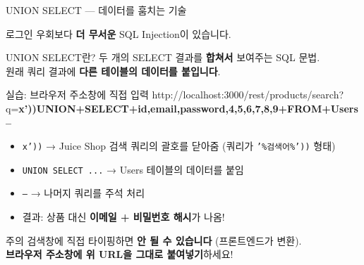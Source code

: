 \documentclass[aspectratio=169,10pt]{beamer}
\newcommand{\hlt}[1]{\textcolor{accent}{\textbf{#1}}}
\newcommand{\red}[1]{\textcolor{redTeam}{\textbf{#1}}}
\begin{document}
\begin{frame}[shrink=3]{UNION SELECT — 데이터를 훔치는 기술}

로그인 우회보다 \hlt{더 무서운} SQL Injection이 있습니다.

\vspace{0.3em}
\begin{block}{UNION SELECT란?}
두 개의 SELECT 결과를 \hlt{합쳐서} 보여주는 SQL 문법.\\
원래 쿼리 결과에 \textbf{다른 테이블의 데이터를 붙입니다}.
\end{block}

\vspace{0.3em}
\begin{block}{실습: 브라우저 주소창에 직접 입력}
{\ttfamily\tiny
http://localhost:3000/rest/products/search?q=\red{x'))UNION+SELECT+id,email,password,4,5,6,7,8,9+FROM+Users--}
}
\vspace{0.2em}
\begin{itemize}
    \item \texttt{x'))} → Juice Shop 검색 쿼리의 괄호를 닫아줌 (쿼리가 \texttt{'\%검색어\%'))} 형태)
    \item \texttt{UNION SELECT ...} → Users 테이블의 데이터를 붙임
    \item \texttt{--} → 나머지 쿼리를 주석 처리
    \item 결과: 상품 대신 \hlt{이메일 + 비밀번호 해시}가 나옴!
\end{itemize}
\end{block}

\vspace{0.3em}
\begin{alertblock}{주의}
검색창에 직접 타이핑하면 \textbf{안 될 수 있습니다} (프론트엔드가 변환).\\
\hlt{브라우저 주소창에 위 URL을 그대로 붙여넣기}하세요!
\end{alertblock}
\end{frame}
\end{document}
